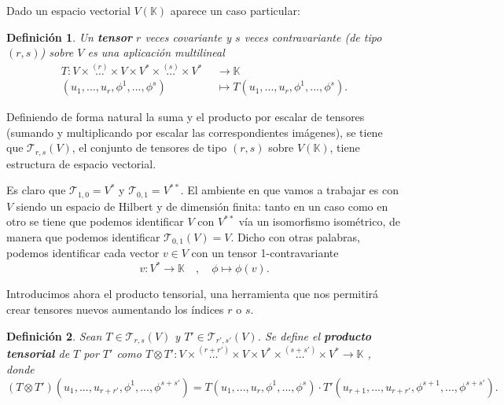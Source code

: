 \documentclass[11pt,a4paper,twoside,pdf]{article}
\numberwithin{equation}{section}
\newtheorem{definition}{Definición}
\begin{document}
	Dado un espacio vectorial $V(\mathbb{K})$ aparece un caso particular: 
	
	\begin{definition}
		Un \textbf{tensor} $r$ veces covariante y $s$ veces contravariante (de tipo $(r,s)$) sobre $V$ es una aplicación multilineal
			\begin{equation}
				\begin{aligned}
					T: V\times \overset{(r)}{\hdots}\times V \times V^* \times \overset{(s)}{\hdots} \times
				 	V^* \:	&  \:\rightarrow \mathbb{K} \\
				 	(u_1,...,u_r,\phi^1,...,\phi^s) \: &  \: \mapsto T(u_1,...,u_r,\phi^1,...,\phi^s)	.			 	
				\end{aligned}
			\end{equation}
	\end{definition}
	
	Definiendo de forma natural la suma y el producto por escalar de tensores (sumando y multiplicando por escalar las correspondientes imágenes), se tiene que $\mathcal{T}_{r,s}(V)$, el conjunto de tensores de tipo $(r,s)$ sobre $V(\mathbb{K})$, tiene estructura de espacio vectorial.
	
	Es claro que $\mathcal{T}_{1,0}=V^*$ y $\mathcal{T}_{0,1}=V^{**}$. El ambiente en que vamos a trabajar es con $V$ siendo un espacio de Hilbert y de dimensión finita: tanto en un caso como en otro se tiene que podemos identificar $V$ con $V^{**}$ vía un isomorfismo isométrico, de manera que podemos identificar $\mathcal{T}_{0,1}(V)=V$. Dicho con otras palabras, podemos identificar cada vector $v\in V$ con un tensor 1-contravariante
		\begin{equation*}
			v: V^* \rightarrow \mathbb{K} \quad , \quad \phi \mapsto \phi(v).
		\end{equation*}
		
	Introducimos ahora el producto tensorial, una herramienta que nos permitirá crear tensores nuevos aumentando los índices $r$ o $s$. 
		\begin{definition} \label{def: producto tensorial}
			Sean $T\in \mathcal{T}_{r,s}(V) $ y $T' \in \mathcal{T}_{r',s'}(V)$. Se define el \textbf{producto tensorial} de $T$ por $T'$ como $T\otimes T' : V\times \overset{(r+r')}{\hdots}\times V \times V^* \times \overset{(s+s')}{\hdots} \times V^* \rightarrow \mathbb{K}$ , donde
			\begin{equation*} 
				(T\otimes T')(u_1,...,u_{r+r'},\phi^1,...,\phi^{s+s'})=T(u_1,...,u_r,\phi^1,...,\phi^s)\cdot T'(u_{r+1},...,u_{r+r'},\phi^{s+1},...,\phi^{s+s'}).
			\end{equation*}
		\end{definition}
		
\end{document}
